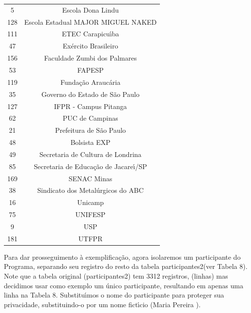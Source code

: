 \documentclass[
12pt,		%
openright,	%
twoside,  %
a4paper,			%
chapter=TITLE,		%
english,			%
french,				%
spanish,			%
brazil				%
]{USPSC-classe/USPSC}
\begin{document}
\begin{table}[htb]
\begin{tabular}{|c|c|}
                    5  &  Escola Dona Lindu \\
                  128  &  Escola Estadual MAJOR MIGUEL NAKED \\
                  111  &  ETEC Carapicu\'{\i}ba \\
                   47  &  Ex\'ercito Brasileiro \\
                  156  &  Faculdade Zumbi dos Palmares \\
                   53  &  FAPESP \\
                  119  &  Funda\c{c}\~ao Arauc\'aria \\
                   35  &  Governo do Estado de S\~ao Paulo \\
                  127  &  IFPR - Campus Pitanga \\
                   62  &  PUC de Campinas \\
                   21  &  Prefeitura de S\~ao Paulo           \\
                   48  &  Bolsista EXP \\
                   49  &  Secretaria de Cultura de Londrina \\
                   85  &  Secretaria de Educa\c{c}\~ao de Jacare\'{\i}/SP \\
                  169  &  SENAC Minas  \\
                   38  &  Sindicato dos Metal\'urgicos do ABC \\
                   16  &  Unicamp \\
                   75  &  UNIFESP  \\
                    9  &  USP \\
                  181  &  UTFPR \\
\hline
\end{tabular}
\end{table}


Para dar prosseguimento \`a exemplifica\c{c}\~ao, agora isolaremos um participante do Programa, separando seu registro do resto da tabela \textquotedbl participantes2\textquotedbl  (ver Tabela 8). Note que a tabela original (participantes2)  tem 3312 registros, (linhas) mas decidimos usar como exemplo um \'unico participante, resultando em apenas uma linha na Tabela 8. Substitu\'{\i}mos o nome do participante para proteger sua privacidade, substituindo-o por um nome fict\'{\i}cio (\textquotedbl Maria Pereira \textquotedbl ).
\end{document}
